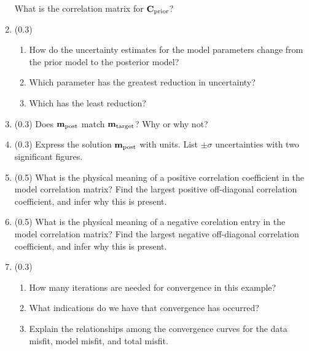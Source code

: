 \documentclass[11pt,titlepage,fleqn]{article}
\begin{document}
\begin{enumerate}
What is the correlation matrix for $\mbox{${\bf C}$}_{\rm prior}$?


\item (0.3)
\begin{enumerate}
\item How do the uncertainty estimates for the model parameters change from the prior model to the posterior model?
\item Which parameter has the greatest reduction in uncertainty?
\item Which has the least reduction?
\end{enumerate}


\item (0.3) Does $\mbox{${\bf m}$}_{\rm post}$ match $\mbox{${\bf m}$}_{\rm target}$? Why or why not?


\item (0.3) Express the solution $\mbox{${\bf m}$}_{\rm post}$ with units. List $\pm\sigma$ uncertainties with two significant figures.


\item (0.5) What is the physical meaning of a positive correlation coefficient in the model correlation matrix? Find the largest positive off-diagonal correlation coefficient, and infer why this is present.


\item (0.5) What is the physical meaning of a negative corelation entry in the model correlation matrix? Find the largest negative off-diagonal correlation coefficient, and infer why this is present.


\item (0.3)
%
\begin{enumerate}
\item How many iterations are needed for convergence in this example?
\item What indications do we have that convergence has occurred?
\item Explain the relationships among the convergence curves for the data misfit, model misfit, and total misfit.
\end{enumerate}



\end{enumerate}
\end{document}
